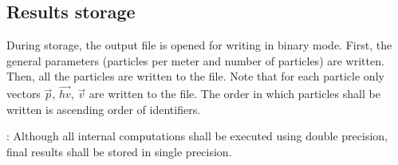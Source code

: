\subsection{Results storage}

During storage, the output file is opened for writing in binary mode.  First,
the general parameters (particles per meter and number of particles) are
written. Then, all the particles are written to the file. Note that for each
particle only vectors $\vec{p}$, $\overrightarrow{hv}$, $\vec{v}$ are written
to the file.  The order in which particles shall be written is ascending order
of identifiers.

: Although all internal computations shall be executed
using double precision, final results shall be stored in single precision.
